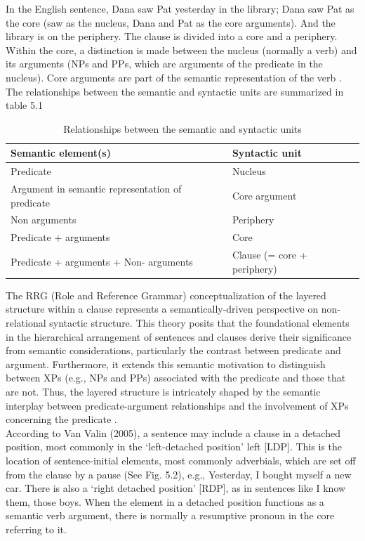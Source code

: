 In the English sentence, Dana saw Pat yesterday in the library; Dana saw Pat as the core (saw as the nucleus, Dana and Pat as the core arguments). And the library is on the periphery. The clause is divided into a core and a periphery. Within the core, a distinction is made between the nucleus (normally a verb) and its arguments (NPs and PPs, which are
arguments of the predicate in the nucleus). Core arguments are part of the semantic representation of the verb \parencite{van1997syntax}. The
relationships between the semantic and syntactic units are summarized in table 5.1\\

\begin{table}[H]
    \centering
    \begin{tabular}{|p{7cm}|p{4cm}|} \hline 
         \textbf{Semantic element(s)} &  \textbf{Syntactic unit}\\ \hline 
         Predicate & Nucleus\\ \hline 
         Argument in semantic representation of predicate& Core argument\\ \hline 
         Non arguments& Periphery\\ \hline 
         Predicate + arguments& Core\\ \hline 
         Predicate + arguments + Non- arguments& Clause (= core + periphery)\\ \hline
    \end{tabular}
    \caption{Relationships between the semantic and syntactic units}
    \label{tab:my_label}
\end{table}


The RRG (Role and Reference Grammar) conceptualization of the layered structure within a clause represents a semantically-driven perspective on non-relational syntactic structure. This theory posits that the foundational elements in the hierarchical arrangement of sentences and clauses derive their significance from semantic considerations, particularly the contrast between predicate and argument. Furthermore, it extends this semantic motivation to distinguish between XPs (e.g., NPs and PPs) associated with the predicate and those that are not. Thus, the layered structure is intricately shaped by the semantic interplay between predicate-argument relationships and the involvement of XPs concerning the predicate \parencite{van1997syntax}. \\

According to Van Valin (2005), a sentence may include a clause in a detached position, most commonly in the ‘left-detached position’ left [LDP]. This is the location of sentence-initial elements, most commonly adverbials, which are set off from the clause by a pause (See Fig. 5.2), e.g., Yesterday, I bought myself a new car. There is also a ‘right detached position’ [RDP], as in sentences like I know them, those boys. 
When the element in a detached position functions as a semantic verb argument, there is normally a resumptive pronoun in the core referring to it. \\

